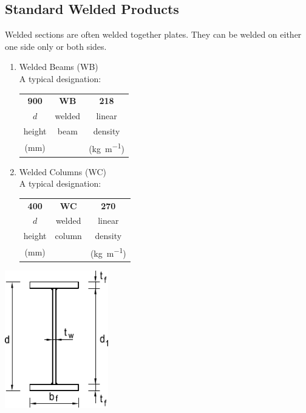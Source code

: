 \subsection{Standard Welded Products}
Welded sections are often welded together plates. They can be welded on either one side only or both sides.

\begin{minipage}[t]{9cm}
\begin{enumerate}
\item Welded Beams (WB)\\
A typical designation:
\begin{table}[H]\centering
\begin{tabular}{ccc}
	\textbf{900} & \textbf{WB} &        \textbf{218}        \\
	    $d$      &   welded    &           linear           \\
	   height    &    beam     &          density           \\
	 (\si{\mm})  &             & (\si{\kilogram\per\meter})
\end{tabular}
\end{table}
\item Welded Columns (WC)\\
A typical designation:
\begin{table}[H]\centering
\begin{tabular}{ccc}
	\textbf{400} & \textbf{WC} &        \textbf{270}        \\
	    $d$      &   welded    &           linear           \\
	   height    &   column    &          density           \\
	 (\si{\mm})  &             & (\si{\kilogram\per\meter})
\end{tabular}
\end{table}
\end{enumerate}
\end{minipage}\hfill
\begin{minipage}[t]{5cm}
\vfill\centering\includegraphics[width=4.5cm,valign=t]{PIC/CH02/WB}
\end{minipage}


